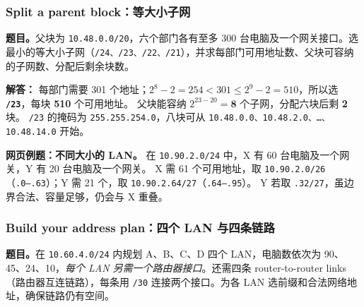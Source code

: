 \documentclass[11pt,a4paper,fontset=fandol]{ctexart}
\renewcommand{\exercisequestion}[2]{%
  \Needspace{5\baselineskip}%
  \subsubsection{#2}\label{exercise:#1}%
}
\renewenvironment{checkedsolution}
  {\par\nopagebreak[4]\textbf{解答：}\ignorespaces}
  {\par}
\begin{document}
\exercisequestion{SC2008-HW01-Q04}{Split a parent block：等大小子网}

\textbf{题目。}父块为 \texttt{10.48.0.0/20}，六个部门各有至多 300 台电脑及一个网关接口。选最小的等大小子网（\texttt{/24、/23、/22、/21}），并求每部门可用地址数、父块可容纳的子网数、分配后剩余块数。

\begin{checkedsolution}
每部门需要 301 个地址；$2^8-2=254<301\leq2^9-2=510$，所以选 \textbf{\texttt{/23}}，每块 \textbf{510} 个可用地址。
父块能容纳 $2^{23-20}=\mathbf{8}$ 个子网，分配六块后剩 \textbf{2} 块。
\texttt{/23} 的掩码为 \texttt{255.255.254.0}，八块可从 \texttt{10.48.0.0、10.48.2.0、\ldots、10.48.14.0} 开始。
\end{checkedsolution}

\textbf{网页例题：不同大小的 LAN。}
在 \texttt{10.90.2.0/24} 中，X 有 60 台电脑及一个网关，Y 有 20 台电脑及一个网关。
X 需 61 个可用地址，取 \texttt{10.90.2.0/26}（\texttt{.0--.63}）；Y 需 21 个，取 \texttt{10.90.2.64/27}（\texttt{.64--.95}）。
Y 若取 \texttt{.32/27}，虽边界合法、容量足够，仍会与 X 重叠。

\exercisequestion{SC2008-HW01-Q05}{Build your address plan：四个 LAN 与四条链路}

\textbf{题目。}在 \texttt{10.60.4.0/24} 内规划 A、B、C、D 四个 LAN，电脑数依次为 90、45、24、10，\emph{每个 LAN 另需一个路由器接口}。还需四条 router-to-router links（路由器互连链路），每条用 \texttt{/30} 连接两个接口。为各 LAN 选前缀和合法网络地址，确保链路仍有空间。
\end{document}
